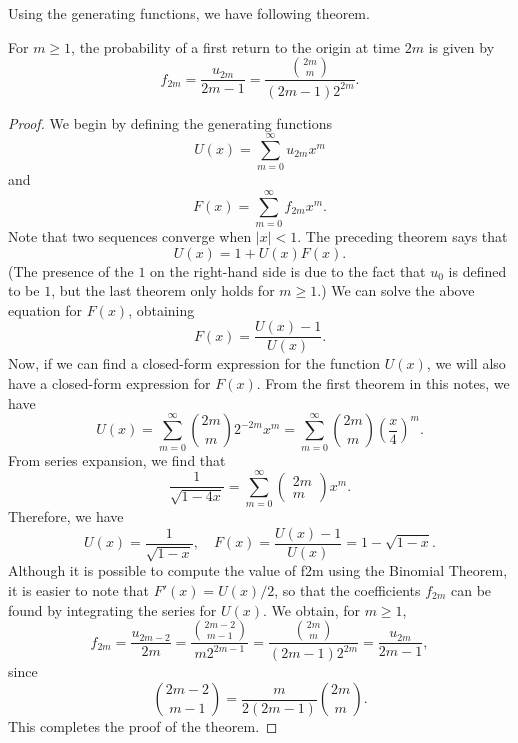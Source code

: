Using the generating functions, we have following theorem.
\begin{theorem}
For $m \geq 1$, the probability of a first return to the origin at time
$2m$ is given by
\begin{equation*}
    f_{2 m}=\frac{u_{2 m}}{2 m-1}=\frac{\binom{2m}{m}}{(2 m-1) 2^{2 m}}.
\end{equation*}
\end{theorem}

\begin{proof}
We begin by defining the generating functions
\begin{equation*}
    U(x)=\sum_{m=0}^{\infty} u_{2 m} x^{m}
\end{equation*}
and 
\begin{equation*}
    F(x)=\sum_{m=0}^{\infty} f_{2 m} x^{m}.
\end{equation*}
Note that two sequences converge when $\left\vert x \right\vert<1$. The preceding theorem says that 
\begin{equation*}
    U(x)=1+U(x) F(x).
\end{equation*}
(The presence of the $1$ on the right-hand side is due to the fact that $u_0$ is defined to be $1$, but the last theorem only holds for $m \geq 1$.) We can solve the above equation for $F(x)$, obtaining
\begin{equation*}
    F(x)=\frac{U(x)-1}{U(x)}.
\end{equation*}
Now, if we can find a closed-form expression for the function $U(x)$, we will also have a closed-form expression for $F(x)$. From the first theorem in this notes, we have
\begin{equation*}
    U(x)=\sum_{m=0}^{\infty}\binom{2m}{m} 2^{-2 m} x^{m} = \sum_{m=0}^\infty \binom{2m}{m} \left( \frac{x}{4} \right)^m.
\end{equation*}
From series expansion, we find that 
\begin{equation*}
    \frac{1}{\sqrt{1-4 x}}=\sum_{m=0}^{\infty}\left(\begin{array}{c}{2 m} \\ {m}\end{array}\right) x^{m}.
\end{equation*}
Therefore, we have 
\begin{equation*}
    U(x)=\frac{1}{\sqrt{1-x}}, \quad F(x) = \frac{U(x)-1}{U(x)} = 1-\sqrt{1-x}.
\end{equation*}
Although it is possible to compute the value of f2m using the Binomial Theorem, it is easier to note that $F'(x) = U(x)/2$, so that the coefficients $f_{2m}$ can be found by integrating the series for $U(x)$. We obtain, for $m \geq 1$, 
\begin{equation*}
    f_{2 m}=\frac{u_{2 m-2}}{2 m} = \frac{\binom{2m-2}{m-1}}{m 2^{2 m-1}} = \frac{\binom{2m}{m}}{(2 m-1) 2^{2 m}} = \frac{u_{2m}}{2m-1},
\end{equation*}
since
\begin{equation*}
    \binom{2m-2}{m-1} = \frac{m}{2(2 m-1)}\binom{2m}{m}.
\end{equation*}
This completes the proof of the theorem.
\end{proof}

